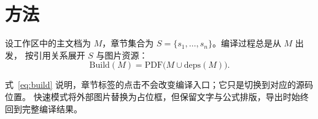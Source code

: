 \section{方法}
\label{sec:method}

设工作区中的主文档为 $M$，章节集合为 $S=\{s_1,\dots,s_n\}$。编译过程总是从 $M$ 出发，
按引用关系展开 $S$ 与图片资源：
\begin{equation}
  \mathrm{Build}(M) = \mathrm{PDF}\bigl(M \cup \mathrm{deps}(M)\bigr).
  \label{eq:build}
\end{equation}

式~\eqref{eq:build} 说明，章节标签的点击不会改变编译入口；它只是切换到对应的源码位置。
快速模式将外部图片替换为占位框，但保留文字与公式排版，导出时始终回到完整编译结果。
